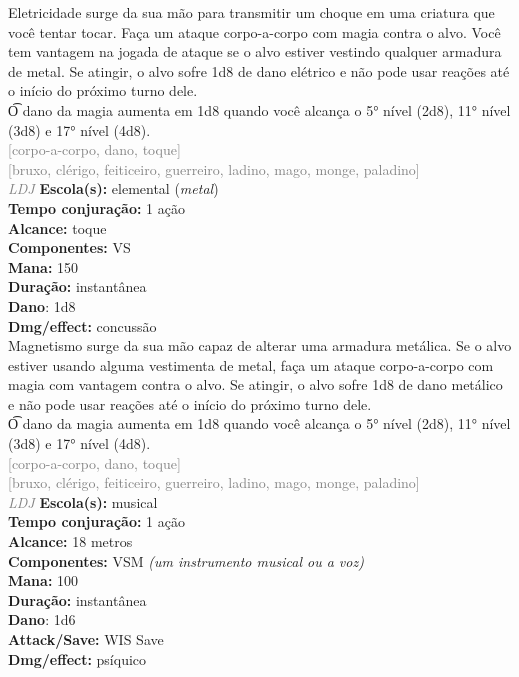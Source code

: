 \documentclass{RPG_Adventure}[2021/10/20]
\begin{document}
{\normalsize Eletricidade surge da sua mão para transmitir um choque em uma criatura que você tentar tocar. Faça um ataque corpo-a-corpo com magia contra o alvo. Você tem vantagem na jogada de ataque se o alvo estiver vestindo qualquer armadura de metal. Se atingir, o alvo sofre 1d8 de dano elétrico e não pode usar reações até o início do próximo turno dele.\\\t O dano da magia aumenta em 1d8 quando você alcança o 5° nível (2d8), 11° nível (3d8) e 17° nível (4d8).\\}
{\scriptsize \textcolor{gray}{[corpo-a-corpo, dano, toque]\\}}
{\scriptsize \textcolor{gray}{[bruxo, clérigo, feiticeiro, guerreiro, ladino, mago, monge, paladino]\\}}
{\tiny \textcolor{gray}{\textit{LDJ}}}
{\small \t \textbf{Escola(s):} elemental (\textit{metal})\\\t \textbf{Tempo conjuração:} 1 ação\\\t \textbf{Alcance:} toque\\\t \textbf{Componentes:} VS\\\t \textbf{Mana:} 150\\\t \textbf{Duração:} instantânea\\\t \textbf{Dano}: 1d8\\\t \textbf{Dmg/effect:} concussão\\}
{\normalsize Magnetismo surge da sua mão capaz de alterar uma armadura metálica. Se o alvo estiver usando alguma vestimenta de metal, faça um ataque corpo-a-corpo com magia com vantagem contra o alvo. Se atingir, o alvo sofre 1d8 de dano metálico e não pode usar reações até o início do próximo turno dele.\\\t O dano da magia aumenta em 1d8 quando você alcança o 5° nível (2d8), 11° nível (3d8) e 17° nível (4d8).\\}
{\scriptsize \textcolor{gray}{[corpo-a-corpo, dano, toque]\\}}
{\scriptsize \textcolor{gray}{[bruxo, clérigo, feiticeiro, guerreiro, ladino, mago, monge, paladino]\\}}
{\tiny \textcolor{gray}{\textit{LDJ}}}
{\small \t \textbf{Escola(s):} musical\\\t \textbf{Tempo conjuração:} 1 ação\\\t \textbf{Alcance:} 18 metros\\\t \textbf{Componentes:} VSM \textit{(um instrumento musical ou a voz)}\\\t \textbf{Mana:} 100\\\t \textbf{Duração:} instantânea\\\t \textbf{Dano}: 1d6\\\t \textbf{Attack/Save:} WIS Save\\\t \textbf{Dmg/effect:} psíquico\\}
\end{document}
